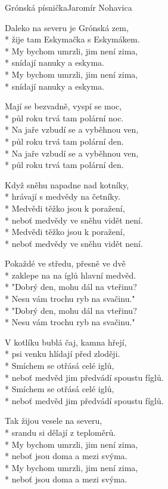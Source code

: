 \documentclass[10.5pt]{book}
\begin{document}
\begin{poem}{Grónská písnička}{Jaromír Nohavica}

\settowidth{\versewidth}{neboť medvěd jim předvádí spoustu fíglů.}

Daleko na severu je Grónská zem,\\*
žije tam Eskymačka s Eskymákem.\\*
My bychom umrzli, jim není zima,\\*
snídají nanuky a eskyma.\\*
My bychom umrzli, jim není zima,\\*
snídají nanuky a eskyma.

Mají se bezvadně, vyspí se moc,\\*
půl roku trvá tam polární noc.\\*
Na jaře vzbudí se a vyběhnou ven,\\*
půl roku trvá tam polární den.\\*
Na jaře vzbudí se a vyběhnou ven,\\*
půl roku trvá tam polární den.

Když sněhu napadne nad kotníky,\\*
hrávají s medvědy na četníky.\\*
Medvědi těžko jsou k poražení,\\*
neboť medvědy ve sněhu vidět není.\\*
Medvědi těžko jsou k poražení,\\*
neboť medvědy ve sněhu vidět není.

Pokaždé ve středu, přesně ve dvě\\*
zaklepe na na íglů hlavní medvěd.\\*
"Dobrý den, mohu dál na vteřinu?\\*
Nesu vám trochu ryb na svačinu."\\*
"Dobrý den, mohu dál na vteřinu?\\*
Nesu vám trochu ryb na svačinu."

V kotlíku bublá čaj, kamna hřejí,\\*
psi venku hlídají před zloději.\\*
Smíchem se otřásá celé iglů,\\*
neboť medvěd jim předvádí spoustu fíglů.\\*
Smíchem se otřásá celé iglů,\\*
neboť medvěd jim předvádí spoustu fíglů.

Tak žijou vesele na severu,\\*
srandu si dělají z teploměrů.\\*
My bychom umrzli, jim není zima,\\*
neboť jsou doma a mezi svýma.\\*
My bychom umrzli, jim není zima,\\*
neboť jsou doma a mezi svýma.
\end{poem}
\end{document}

